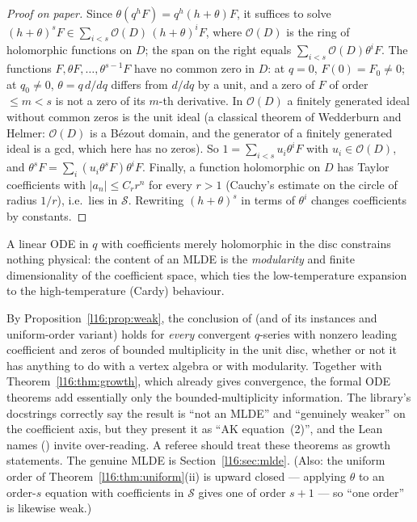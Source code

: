 \begin{proof}[Proof on paper]
Since $\theta(q^hF) = q^h(h+\theta)F$, it suffices to solve $(h+\theta)^sF\in\sum_{i<s}\mathcal O(D)\,(h+\theta)^iF$, where
$\mathcal O(D)$ is the ring of holomorphic functions on $D$; the span on the right equals
$\sum_{i<s}\mathcal O(D)\theta^iF$. The functions $F,\theta F,\dots,\theta^{s-1}F$ have no common zero in $D$: at $q=0$,
$F(0)=F_0\ne0$; at $q_0\ne0$, $\theta = q\,d/dq$ differs from $d/dq$ by a unit, and a zero of $F$ of order $\le m<s$ is not
a zero of its $m$-th derivative. In $\mathcal O(D)$ a finitely generated ideal without common zeros is the unit ideal (a
classical theorem of Wedderburn and Helmer: $\mathcal O(D)$ is a B\'ezout domain, and the generator of a finitely generated
ideal is a gcd, which here has no zeros). So $1 = \sum_{i<s}u_i\theta^iF$ with $u_i\in\mathcal O(D)$, and
$\theta^sF = \sum_i(u_i\theta^sF)\theta^iF$. Finally, a function holomorphic on $D$ has Taylor coefficients with
$|a_n|\le C_rr^n$ for every $r>1$ (Cauchy's estimate on the circle of radius $1/r$), i.e.\ lies in $\mathcal S$. Rewriting
$(h+\theta)^s$ in terms of $\theta^i$ changes coefficients by constants.
\end{proof}

\begin{physics}
A linear ODE in $q$ with coefficients merely holomorphic in the disc constrains nothing physical: the content of an MLDE is
the \emph{modularity} and finite dimensionality of the coefficient space, which ties the low-temperature expansion to the
high-temperature (Cardy) behaviour.
\end{physics}

\begin{warning}[title={The formal ODE theorems say little beyond convergence (moderate)}]
By Proposition~\ref{l16:prop:weak}, the conclusion of \allowbreak{}\allowbreak{} (and of its
instances and uniform-order variant) holds for \emph{every} convergent $q$-series with nonzero leading coefficient
and zeros of bounded multiplicity in the unit disc, whether or not it has anything to do with a vertex algebra or with
modularity. Together with Theorem~\ref{l16:thm:growth}, which already gives convergence, the formal ODE theorems add
essentially only the bounded-multiplicity information. The library's docstrings correctly say the result is ``not an
MLDE'' and ``genuinely weaker'' on the coefficient axis, but they present it as ``AK equation~(2)'', and the
Lean names (\allowbreak{}\allowbreak{}) invite over-reading. A referee should treat these theorems as growth
statements. The genuine MLDE is Section~\ref{l16:sec:mlde}. (Also: the uniform order of
Theorem~\ref{l16:thm:uniform}(ii) is upward closed --- applying $\theta$ to an order-$s$ equation with coefficients in
$\mathcal S$ gives one of order $s+1$ --- so ``one order'' is likewise weak.)
\end{warning}

